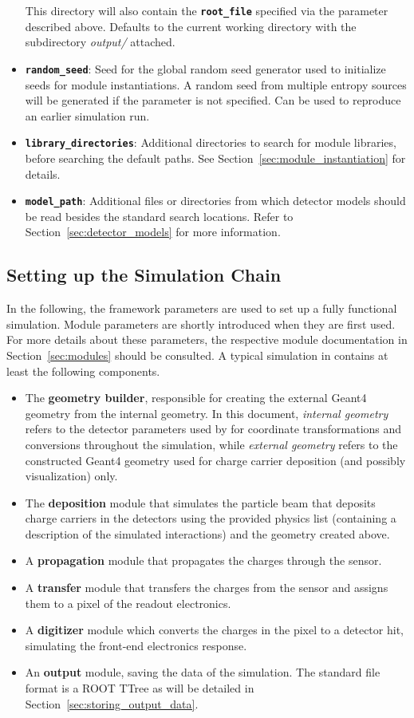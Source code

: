 \begin{itemize}
This directory will also contain the \textbf{\texttt{root\_file}} specified via the parameter described above.
Defaults to the current working directory with the subdirectory \textit{output/} attached.
\item \textbf{\texttt{random\_seed}}: Seed for the global random seed generator used to initialize seeds for module instantiations.
A random seed from multiple entropy sources will be generated if the parameter is not specified.
Can be used to reproduce an earlier simulation run.
\item \textbf{\texttt{library\_directories}}: Additional directories to search for module libraries, before searching the default paths.
See Section~\ref{sec:module_instantiation} for details.
\item \textbf{\texttt{model\_path}}: Additional files or directories from which detector models should be read besides the standard search locations.
Refer to Section~\ref{sec:detector_models} for more information.
\end{itemize}

\subsection{Setting up the Simulation Chain}
\label{sec:setting_up_simulation_chain}

In the following, the framework parameters are used to set up a fully functional simulation.
Module parameters are shortly introduced when they are first used.
For more details about these parameters, the respective module documentation in Section~\ref{sec:modules} should be consulted.
A typical simulation in \apsq contains at least the following components.
\begin{itemize}

\item The \textbf{geometry builder}, responsible for creating the external Geant4 geometry from the internal geometry.
In this document, \emph{internal geometry} refers to the detector parameters used by \apsq for coordinate transformations and conversions throughout the simulation, while \emph{external geometry} refers to the constructed Geant4 geometry used for charge carrier deposition (and possibly visualization) only.
\item The \textbf{deposition} module that simulates the particle beam that deposits charge carriers in the detectors using the provided physics list (containing a description of the simulated interactions) and the geometry created above.
\item A \textbf{propagation} module that propagates the charges through the sensor.
\item A \textbf{transfer} module that transfers the charges from the sensor and assigns them to a pixel of the readout electronics.
\item A \textbf{digitizer} module which converts the charges in the pixel to a detector hit, simulating the front-end electronics response.
\item An \textbf{output} module, saving the data of the simulation.
The \apsq standard file format is a ROOT TTree as will be detailed in Section~\ref{sec:storing_output_data}.
\end{itemize}

